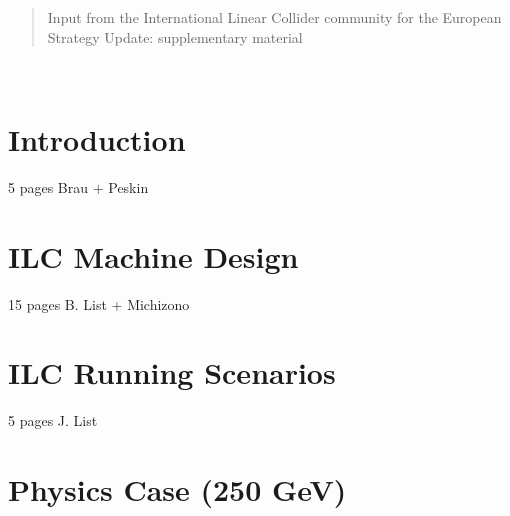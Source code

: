 \documentclass[%
 reprint,
nofootinbib,
 amsmath,amssymb,
 aps,
]{revtex4-1}
\begin{document}
%


\date{\today}%

\begin{abstract}
Input from the International Linear Collider community for the European Strategy Update: supplementary material

\end{abstract}

\maketitle

\tableofcontents

\clearpage
\newpage
\mbox{~}


\section{\label{sec:intro}Introduction}
   5 pages Brau + Peskin
   
   

   
\section{\label{sec:ilc}ILC Machine Design}

  15 pages B. List + Michizono
  

  
\section{\label{sec:runscenarios}ILC Running Scenarios  }
   5 pages J. List
   

   
   
\section{\label{sec:physics}Physics Case (250 GeV) }
\end{document}
